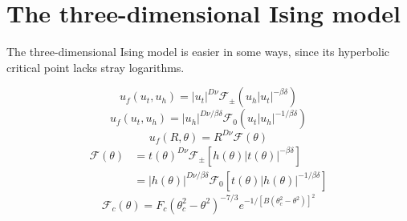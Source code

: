 \documentclass[
  aps,
  pre,
  preprint,
  longbibliography,
  floatfix
]{revtex4-2}
\begin{document}
\section{The three-dimensional Ising model}

\cite{Butera_2011_Free}

The three-dimensional Ising model is easier in some ways, since its hyperbolic critical point lacks stray logarithms.

\begin{equation} \label{eq:free.energy.3d.low}
  u_f(u_t, u_h)
  = |u_t|^{D\nu}\mathcal F_{\pm}(u_h|u_t|^{-\beta\delta})
\end{equation}
\begin{equation} \label{eq:free.energy.3d.mid}
  u_f(u_t, u_h)
  = |u_h|^{D\nu/\beta\delta}\mathcal F_0(u_t|u_h|^{-1/\beta\delta})
\end{equation}
\begin{equation} \label{eq:schofield.3d.free.energy}
  u_f(R, \theta) = R^{D\nu}\mathcal F(\theta)
\end{equation}
\begin{equation} \label{eq:scaling.function.equivalences.3d}
  \begin{aligned}
    \mathcal F(\theta)
    &=t(\theta)^{D\nu}\mathcal F_\pm\left[h(\theta)|t(\theta)|^{-\beta\delta}\right] \\
    &=|h(\theta)|^{D\nu/\beta\delta}\mathcal F_0\left[t(\theta)|h(\theta)|^{-1/\beta\delta}\right]
  \end{aligned}
\end{equation}
\begin{equation}
  \mathcal F_c(\theta)=F_c(\theta_c^2-\theta^2)^{-7/3}e^{-1/[B(\theta_c^2-\theta^2)]^2}
\end{equation}
\end{document}
